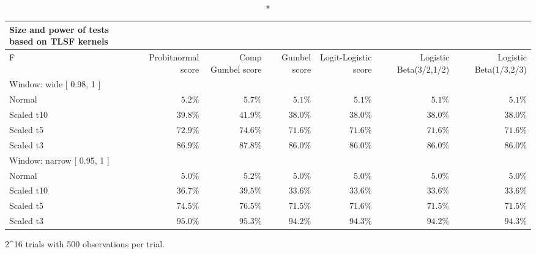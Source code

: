 \setlength{\LTpost}{0mm}
\begin{longtable}{lrrrrrr}
\caption*{
{\large Size and power of tests based on TLSF kernels}
} \\ 
\toprule
F & Probitnormal score & Comp Gumbel score & Gumbel score & Logit-Logistic score & Logistic Beta(3/2,1/2) & Logistic Beta(1/3,2/3) \\ 
\midrule
\multicolumn{7}{l}{Window:  wide  [ 0.98, 1 ]} \\ 
\midrule
Normal & $5.2\%$ & $5.7\%$ & $5.1\%$ & $5.1\%$ & $5.1\%$ & $5.1\%$ \\ 
Scaled t10 & $39.8\%$ & $41.9\%$ & $38.0\%$ & $38.0\%$ & $38.0\%$ & $38.0\%$ \\ 
Scaled t5 & $72.9\%$ & $74.6\%$ & $71.6\%$ & $71.6\%$ & $71.6\%$ & $71.6\%$ \\ 
Scaled t3 & $86.9\%$ & $87.8\%$ & $86.0\%$ & $86.0\%$ & $86.0\%$ & $86.0\%$ \\ 
\midrule
\multicolumn{7}{l}{Window:  narrow  [ 0.95, 1 ]} \\ 
\midrule
Normal & $5.0\%$ & $5.2\%$ & $5.0\%$ & $5.0\%$ & $5.0\%$ & $5.0\%$ \\ 
Scaled t10 & $36.7\%$ & $39.5\%$ & $33.6\%$ & $33.6\%$ & $33.6\%$ & $33.6\%$ \\ 
Scaled t5 & $74.5\%$ & $76.5\%$ & $71.5\%$ & $71.6\%$ & $71.5\%$ & $71.5\%$ \\ 
Scaled t3 & $95.0\%$ & $95.3\%$ & $94.2\%$ & $94.3\%$ & $94.2\%$ & $94.3\%$ \\ 
\bottomrule
\end{longtable}
\begin{minipage}{\linewidth}
2\textasciicircum{}16 trials with 500 observations per trial.\\
\end{minipage}

